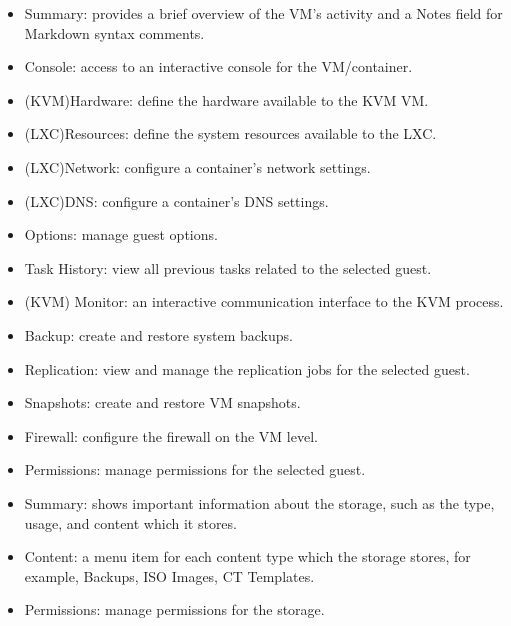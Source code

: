 \begin{itemize}[leftmargin=2cm]

	\item Summary: provides a brief overview of the VM’s activity and a Notes field for Markdown syntax comments.

	\item Console: access to an interactive console for the VM/container.

	\item (KVM)Hardware: define the hardware available to the KVM VM.

	\item (LXC)Resources: define the system resources available to the LXC.

	\item (LXC)Network: configure a container’s network settings.

	\item (LXC)DNS: configure a container’s DNS settings.

	\item Options: manage guest options.

	\item Task History: view all previous tasks related to the selected guest.

	\item (KVM) Monitor: an interactive communication interface to the KVM process.

	\item Backup: create and restore system backups.

	\item Replication: view and manage the replication jobs for the selected guest.

	\item Snapshots: create and restore VM snapshots.

	\item Firewall: configure the firewall on the VM level.

	\item Permissions: manage permissions for the selected guest.

\end{itemize}

\begin{itemize}[leftmargin=2cm]

	\item Summary: shows important information about the storage, such as the type, usage, and content which it stores.

	\item Content: a menu item for each content type which the storage stores, for example, Backups, ISO Images, CT Templates.

	\item Permissions: manage permissions for the storage.

\end{itemize}

